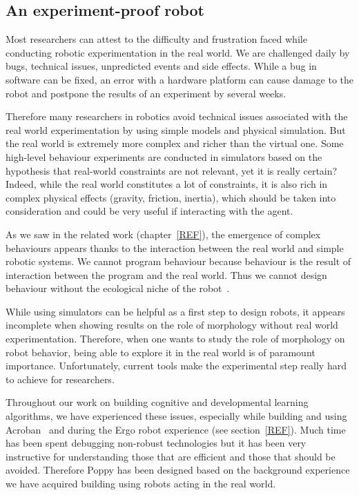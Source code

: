 \subsection{An experiment-proof robot} %

Most researchers can attest to the difficulty and frustration faced while conducting robotic experimentation in the real world. We are challenged daily by bugs, technical issues, unpredicted events and side effects. While a bug in software can be fixed, an error with a hardware platform can cause damage to the robot and postpone the results of an experiment by several weeks.

Therefore many researchers in robotics avoid technical issues associated with the real world experimentation by using simple models and physical simulation. But the real world is extremely more complex and richer than the virtual one.
Some high-level behaviour experiments are conducted in simulators based on the hypothesis that real-world constraints are not relevant, yet it is really certain?
Indeed, while the real world constitutes a lot of constraints, it is also rich in complex physical effects (gravity, friction, inertia), which should be taken into consideration and could be very useful if interacting with the agent.

As we saw in the related work (chapter~\ref{REF}), the emergence of complex behaviours appears thanks to the interaction between the real world and simple robotic systems. We cannot program behaviour because behaviour is the result of interaction  between the program and the real world. Thus we cannot design behaviour without the ecological niche of the robot~\cite{Steels1991emergence}.

While using simulators can be helpful as a first step to design robots, it appears incomplete when showing results on the role of morphology without real world experimentation.
Therefore, when one wants to study the role of morphology on robot behavior, being able to explore it in the real world is of paramount importance. Unfortunately, current tools make the experimental step really hard to achieve for researchers.

Throughout our work on building cognitive and developmental learning algorithms, we have experienced these issues, especially while building and using Acroban~\cite{Ly2010} and during the Ergo robot experience (see section~\ref{REF}). Much time has been spent debugging non-robust technologies but it has been very instructive for understanding those that are efficient and those that should be avoided.
Therefore Poppy has been designed based on the background experience we have acquired building using robots acting in the real world.

